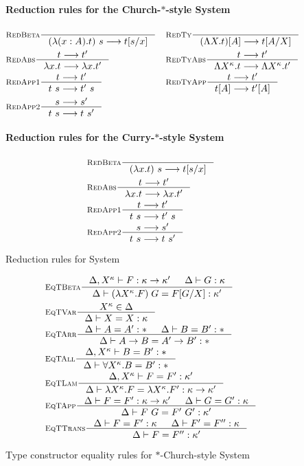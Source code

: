 \begin{figure}
\paragraph{Reduction rules for the Church-$*$-style System \Fw}
\begin{align*}
& \inference[\sc RedBeta]{}{(\l(x:A).t)~s --> t[s/x]}
&&\inference[\sc RedTy]{}{(\L X   .t)[A] --> t[A/X]} \\
& \inference[\sc RedAbs]{t --> t'}{\l x   .t --> \l x   .t'}
&&\inference[\sc RedTyAbs]{t --> t'}{\L X^\kappa   .t --> \L X^\kappa   .t'} \\
& \inference[\sc RedApp1]{t --> t'}{t~s --> t'~s}
&&\inference[\sc RedTyApp]{t --> t'}{t[A] --> t'[A]} \\
& \inference[\sc RedApp2]{s --> s'}{t~s --> t~s'}
\end{align*}
\paragraph{Reduction rules for the Curry-$*$-style System \Fw}
\begin{align*}
& \inference[\sc RedBeta]{}{(\l x   .t)~s --> t[s/x]} \\
& \inference[\sc RedAbs]{t --> t'}{\l x   .t --> \l x   .t'} \\
& \inference[\sc RedApp1]{t --> t'}{t~s --> t'~s} \\
& \inference[\sc RedApp2]{s --> s'}{t~s --> t~s'}
\end{align*}
\caption{Reduction rules for System \Fw}
\label{fig:redfw}
\end{figure}

\begin{figure}
\begin{align*}
& \inference[\sc EqTBeta]
	{\Delta,X^\kappa |- F : \kappa -> \kappa' & \Delta |- G : \kappa}
	{\Delta |- (\l X^\kappa.F)\;G = F[G/X] : \kappa'} \\
& \inference[\sc EqTVar]{X^\kappa \in \Delta}{\Delta |- X = X : \kappa} \\
& \inference[\sc EqTArr]{\Delta |- A=A':* & \Delta |- B=B':*}
			{\Delta |- A -> B=A' -> B':*} \\
& \inference[\sc EqTAll]{\Delta,X^\kappa |- B=B':*}
			{\Delta |- \forall X^\kappa.B=B':*} \\
& \inference[\sc EqTLam]
	{\Delta,X^\kappa |- F=F':\kappa'}
        {\Delta |- \l X^\kappa.F=\l X^\kappa.F':\kappa -> \kappa'} \\
& \inference[\sc EqTApp]
	{\Delta |- F=F' : \kappa -> \kappa' & \Delta |- G=G' : \kappa}
        {\Delta |- F ~ G = F' ~ G' : \kappa'} \\
& \inference[\sc EqTTrans]
	{\Delta |- F=F' : \kappa & \Delta |- F'=F'' : \kappa}
        {\Delta |- F=F'' : \kappa'}
\end{align*}
\caption{Type constructor equality rules for $*$-Church-style System \Fw}
\label{fig:eqtyfw}
\end{figure}

